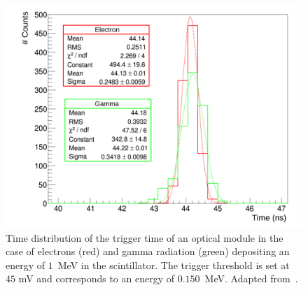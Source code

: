 \begin{figure}[!h]
  \centering
  \includegraphics[width=13cm]{timedifference/fig_timediff/Arnaud_RMS_PM.pdf}
  \caption{Time distribution of the trigger time of an optical module in the case of electrons (red) and gamma radiation (green) depositing an energy of $1$~MeV in the scintillator.
    The trigger threshold is set at $45$ mV and corresponds to an energy of $0.150$~MeV.
    Adapted from~\cite{HuberThesis}.
  \label{fig:Arnaud_RMS_PM}}
\end{figure}
